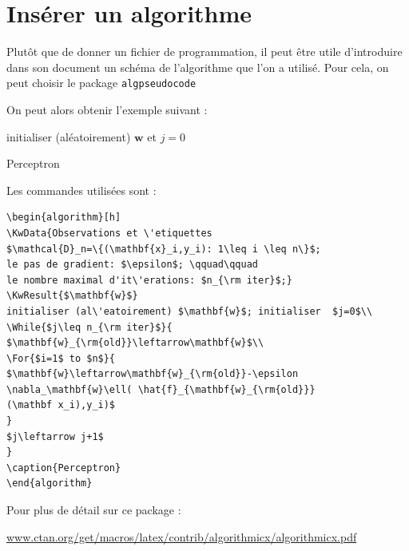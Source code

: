 \section{Insérer un algorithme}
Plutôt que de donner un fichier de programmation, il peut être utile d'introduire dans son document
 un schéma de l'algorithme que l'on a utilisé. Pour cela, on peut choisir le package 
\lstinline+algpseudocode+

On peut alors obtenir  l'exemple suivant :\medskip 


\begin{algorithm}[h]
initialiser (aléatoirement) $\mathbf{w}$ et  $j=0$\\
\caption{Perceptron}
\end{algorithm}

Les commandes utilisées sont : 

\begin{lstlisting}
\begin{algorithm}[h]
\KwData{Observations et \'etiquettes 
$\mathcal{D}_n=\{(\mathbf{x}_i,y_i): 1\leq i \leq n\}$;
le pas de gradient: $\epsilon$; \qquad\qquad 
le nombre maximal d'it\'erations: $n_{\rm iter}$;}
\KwResult{$\mathbf{w}$}
initialiser (al\'eatoirement) $\mathbf{w}$; initialiser  $j=0$\\
\While{$j\leq n_{\rm iter}$}{
$\mathbf{w}_{\rm{old}}\leftarrow\mathbf{w}$\\
\For{$i=1$ to $n$}{
$\mathbf{w}\leftarrow\mathbf{w}_{\rm{old}}-\epsilon 
\nabla_\mathbf{w}\ell( \hat{f}_{\mathbf{w}_{\rm{old}}}
(\mathbf x_i),y_i)$
}
$j\leftarrow j+1$
}
\caption{Perceptron}
\end{algorithm}
\end{lstlisting}


\noindent Pour plus de détail sur ce package :

\noindent\url{www.ctan.org/get/macros/latex/contrib/algorithmicx/algorithmicx.pdf}


